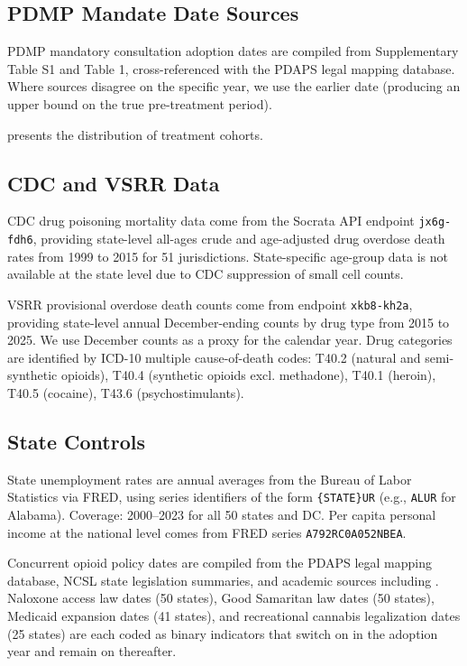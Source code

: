 \documentclass[12pt]{article}
\begin{document}
\subsection{PDMP Mandate Date Sources}

PDMP mandatory consultation adoption dates are compiled from \citet{gunadi2023effect} Supplementary Table S1 and \citet{buchmueller2018effect} Table 1, cross-referenced with the PDAPS legal mapping database. Where sources disagree on the specific year, we use the earlier date (producing an upper bound on the true pre-treatment period).

 presents the distribution of treatment cohorts.



\subsection{CDC and VSRR Data}

CDC drug poisoning mortality data come from the Socrata API endpoint \texttt{jx6g-fdh6}, providing state-level all-ages crude and age-adjusted drug overdose death rates from 1999 to 2015 for 51 jurisdictions. State-specific age-group data is not available at the state level due to CDC suppression of small cell counts.

VSRR provisional overdose death counts come from endpoint \texttt{xkb8-kh2a}, providing state-level annual December-ending counts by drug type from 2015 to 2025. We use December counts as a proxy for the calendar year. Drug categories are identified by ICD-10 multiple cause-of-death codes: T40.2 (natural and semi-synthetic opioids), T40.4 (synthetic opioids excl. methadone), T40.1 (heroin), T40.5 (cocaine), T43.6 (psychostimulants).

\subsection{State Controls}

State unemployment rates are annual averages from the Bureau of Labor Statistics via FRED, using series identifiers of the form \texttt{\{STATE\}UR} (e.g., \texttt{ALUR} for Alabama). Coverage: 2000--2023 for all 50 states and DC. Per capita personal income at the national level comes from FRED series \texttt{A792RC0A052NBEA}.

Concurrent opioid policy dates are compiled from the PDAPS legal mapping database, NCSL state legislation summaries, and academic sources including \citet{davis2019laws}. Naloxone access law dates (50 states), Good Samaritan law dates (50 states), Medicaid expansion dates (41 states), and recreational cannabis legalization dates (25 states) are each coded as binary indicators that switch on in the adoption year and remain on thereafter.
\end{document}
